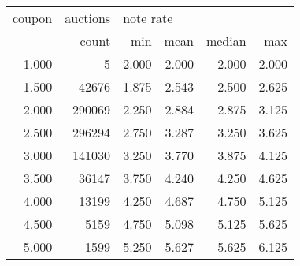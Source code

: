 \begin{tabular}{rrrrrr}
\toprule
coupon & auctions & \multicolumn{4}{l}{note rate} \\
       &    count &       min &  mean & median &   max \\
\midrule
 1.000 &        5 &     2.000 & 2.000 &  2.000 & 2.000 \\
 1.500 &    42676 &     1.875 & 2.543 &  2.500 & 2.625 \\
 2.000 &   290069 &     2.250 & 2.884 &  2.875 & 3.125 \\
 2.500 &   296294 &     2.750 & 3.287 &  3.250 & 3.625 \\
 3.000 &   141030 &     3.250 & 3.770 &  3.875 & 4.125 \\
 3.500 &    36147 &     3.750 & 4.240 &  4.250 & 4.625 \\
 4.000 &    13199 &     4.250 & 4.687 &  4.750 & 5.125 \\
 4.500 &     5159 &     4.750 & 5.098 &  5.125 & 5.625 \\
 5.000 &     1599 &     5.250 & 5.627 &  5.625 & 6.125 \\
\bottomrule
\end{tabular}

